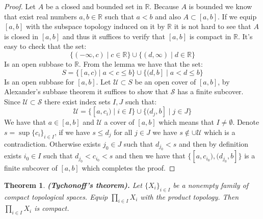 \documentclass[11pt,a4paper]{article}
\theoremstyle{definition}
\theoremstyle{plain}
\newtheorem{theorem}{Theorem}[section]
\newcommand{\R}{\mathbb{R}}
\renewcommand{\tt}[1]{\textnormal{\textbf{(#1).}}} %
\begin{document}
  \begin{proof}
    Let $A$ be a closed and bounded set in $\R$. Because $A$ is bounded
    we know that exist real numbers $a,b \in \R$ such that $a < b$ and
    also $A \subset [a,b]$. If we equip $[a,b]$ with the subspace
    topology induced on it by $\R$ it is not hard to see that $A$ is
    closed in $[a,b]$ and thus it suffices to verify that $[a,b]$
    is compact in $\R$. It's easy to check that the set:
    \[
      \{(-\infty, c) \mid c \in \R\} \cup 
      \{(d, \infty) \mid d \in \R\}
    \]
    Is an open subbase to $\R$. From the lemma we have that the set:
    \[
      S = \{[a, c) \mid a < c \le b\} \cup 
      \{(d, b] \mid a < d \le b\}
    \]
    Is an open subbase for $[a,b]$. Let $\mathcal{U} \subset S$ be an
    open cover of $[a,b]$, by Alexander's subbase theorem it suffices
    to show that $\mathcal{S}$ has a finite subcover. Since 
    $\mathcal{U} \subset \mathcal{S}$ there exist index sets $I,J$ such 
    that:
    \[
      \mathcal{U} = 
      \{[a,c_i) \mid i \in I\} \cup \{(d_j,b] \mid j \in J\}
    \]
    We have that $a \in [a,b]$ and $\mathcal{U}$ a cover of $[a,b]$
    which means that $I \neq \emptyset$. 
    Denote $s = \sup\{c_i\}_{i\in I}$,  if we have $s \le d_j$ for
    all $j \in J$ we have $s \notin \cup\mathcal{U}$ which is a 
    contradiction. Otherwise exists $j_0 \in J$ such that 
    $d_{j_0} < s$ and then by definition exists $i_0 \in I$ such that
    $d_{j_0} < c_{i_0} < s$ and then we have that 
    $\{[a,c_{i_0}), (d_{j_0},b]\}$ is a finite subcover of $[a,b]$ which
    completes the proof.
  \end{proof}
  \begin{theorem}
    \tt{Tychonoff’s theorem}
    Let $\{X_i\}_{i \in I}$ be a nonempty family of compact topological 
    spaces. Equip $\prod_{i \in I}{X_i}$ with the product topology. Then 
    $\prod_{i \in I}{X_i}$ is compact.
  \end{theorem}
\end{document}
